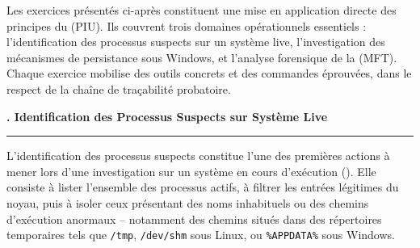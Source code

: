 \documentclass[12pt, a4paper]{report}
\begin{document}
	
	
	
	\thispagestyle{plain}
	\vspace*{0.2cm}
	
	\begin{center}
	\end{center}
	
	\vspace{0.35cm}
	
	\noindent
	Les exercices présentés ci-après constituent une mise en application
	directe des principes du  (PIU).
	Ils couvrent trois domaines opérationnels essentiels : l'identification
	des processus suspects sur un système live, l'investigation des mécanismes
	de persistance sous Windows, et l'analyse forensique de la
	 (MFT). Chaque exercice mobilise des outils
	concrets et des commandes éprouvées, dans le respect de la chaîne de
	traçabilité probatoire.
	
	\vspace{0.4cm}
	
	{\color{CP}\large\sffamily\bfseries\faAngleDoubleRight{}. Identification des Processus Suspects sur Système Live}
	\vspace{0.15cm}
	\color{CV}\rule{\linewidth}{0.8pt}
	\color{CT}
	
	\vspace{0.3cm}
	
	\noindent
	L'identification des processus suspects constitue l'une des premières
	actions à mener lors d'une investigation sur un système en cours
	d'exécution (). Elle consiste à lister
	l'ensemble des processus actifs, à filtrer les entrées légitimes du
	noyau, puis à isoler ceux présentant des noms inhabituels ou des
	chemins d'exécution anormaux -- notamment des chemins situés dans
	des répertoires temporaires tels que \texttt{/tmp}, \texttt{/dev/shm}
	sous Linux, ou \texttt{\%APPDATA\%} sous Windows.
	
\end{document}

